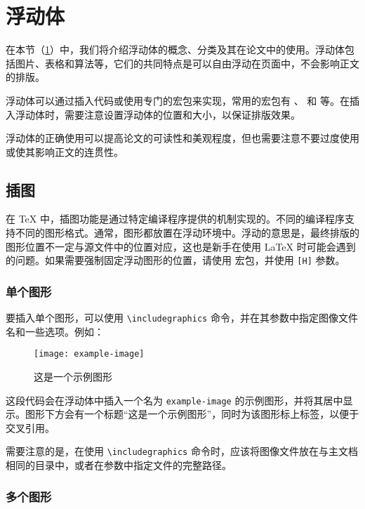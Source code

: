 \section{浮动体}\label{sec:float}

在本节（\cref{sec:float}）中，我们将介绍浮动体的概念、分类及其在论文中的使用。浮动体包括图片、表格和算法等，它们的共同特点是可以自由浮动在页面中，不会影响正文的排版。

浮动体可以通过插入代码或使用专门的宏包来实现，常用的宏包有 、 和  等。在插入浮动体时，需要注意设置浮动体的位置和大小，以保证排版效果。

浮动体的正确使用可以提高论文的可读性和美观程度，但也需要注意不要过度使用或使其影响正文的连贯性。

\subsection{插图}

在 \TeX{} 中，插图功能是通过特定编译程序提供的机制实现的。不同的编译程序支持不同的图形格式。通常，图形都放置在浮动环境中。浮动的意思是，最终排版的图形位置不一定与源文件中的位置对应，这也是新手在使用 \LaTeX{} 时可能会遇到的问题。如果需要强制固定浮动图形的位置，请使用  宏包，并使用 \texttt{[H]} 参数。

\subsubsection{单个图形}

要插入单个图形，可以使用 \verb|\includegraphics| 命令，并在其参数中指定图像文件名和一些选项。例如：

\begin{figure}[htbp]
    \centering
    \texttt{[image: example-image]}
    \caption{这是一个示例图形}
    \label{fig:example}
\end{figure}

这段代码会在浮动体中插入一个名为 \verb|example-image| 的示例图形，并将其居中显示。图形下方会有一个标题“这是一个示例图形”，同时为该图形标上标签，以便于交叉引用。

需要注意的是，在使用 \verb|\includegraphics| 命令时，应该将图像文件放在与主文档相同的目录中，或者在参数中指定文件的完整路径。

\subsubsection{多个图形}

